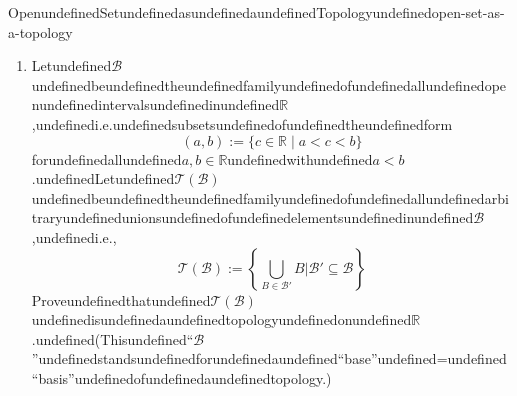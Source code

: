 \begin{mystexercise}{OpenundefinedSetundefinedasundefinedaundefinedTopologyundefined}{open-set-as-a-topology}\label{Open Set as a Topology}\label{open set as a topology}\begin{enumerate}
\item Letundefined$\mathcal{B}$undefinedbeundefinedtheundefinedfamilyundefinedofundefinedallundefinedopenundefinedintervalsundefinedinundefined$\mathbb{R}$,undefinedi.e.undefinedsubsetsundefinedofundefinedtheundefinedform
\begin{equation}
(a, b) := \{c \in \mathbb{R} \mid a < c < b\}
\end{equation}
forundefinedallundefined$a, b \in \mathbb{R}$undefinedwithundefined$a < b$.undefinedLetundefined$\mathcal{T}(\mathcal{B})$undefinedbeundefinedtheundefinedfamilyundefinedofundefinedallundefinedarbitraryundefinedunionsundefinedofundefinedelementsundefinedinundefined$\mathcal{B}$,undefinedi.e.,
\begin{equation}
\mathcal{T}(\mathcal{B}) := \left\{ \bigcup_{B \in \mathcal{B}'} B \mathrel{\Big\vert{}} \mathcal{B}' \subseteq \mathcal{B} \right\}
\end{equation}
Proveundefinedthatundefined$\mathcal{T}(\mathcal{B})$undefinedisundefinedaundefinedtopologyundefinedonundefined$\mathbb{R}$.undefined(Thisundefined``$\mathcal{B}$''undefinedstandsundefinedforundefinedaundefined``base''undefined=undefined``basis''undefinedofundefinedaundefinedtopology.)



\end{enumerate}
\end{mystexercise}
